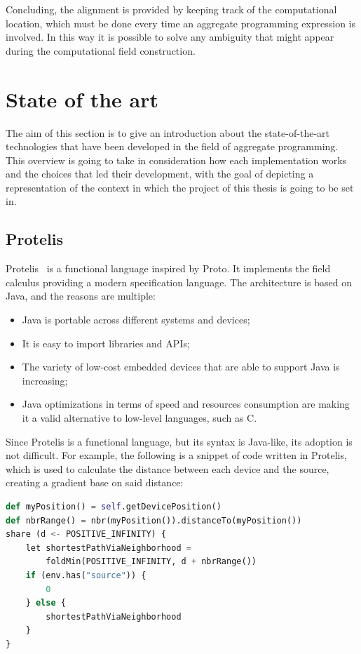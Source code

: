 Concluding, the alignment is provided by keeping track of the computational location, which must be done every time an aggregate programming expression is involved. In this way it is possible to solve any ambiguity that might appear during the computational field construction.

\section{State of the art}\label{section:state_of_the_art}
The aim of this section is to give an introduction about the state-of-the-art technologies that have been developed in the field of aggregate programming. This overview is going to take in consideration how each implementation works and the choices that led their development, with the goal of depicting a representation of the context in which the project of this thesis is going to be set in.

\subsection{Protelis}\label{subsection:protelis}
Protelis~\cite{protelis_introduction} is a functional language inspired by Proto. It implements the field calculus providing a modern specification language.\newline
The architecture is based on Java, and the reasons are multiple:
\begin{itemize}
    \item Java is portable across different systems and devices;
    \item It is easy to import libraries and APIs;
    \item The variety of low-cost embedded devices that are able to support Java is increasing;
    \item Java optimizations in terms of speed and resources consumption are making it a valid alternative to low-level languages, such as C.
\end{itemize}

Since Protelis is a functional language, but its syntax is Java-like, its adoption is not difficult. For example, the following is a snippet of code written in Protelis, which is used to calculate the distance between each device and the source, creating a gradient base on said distance:
\begin{lstlisting}[language=Python, caption=Protelis example, captionpos=b]
def myPosition() = self.getDevicePosition()
def nbrRange() = nbr(myPosition()).distanceTo(myPosition())
share (d <- POSITIVE_INFINITY) {
    let shortestPathViaNeighborhood = 
        foldMin(POSITIVE_INFINITY, d + nbrRange())
    if (env.has("source")) { 
        0 
    } else {
        shortestPathViaNeighborhood
    }
}
\end{lstlisting}

